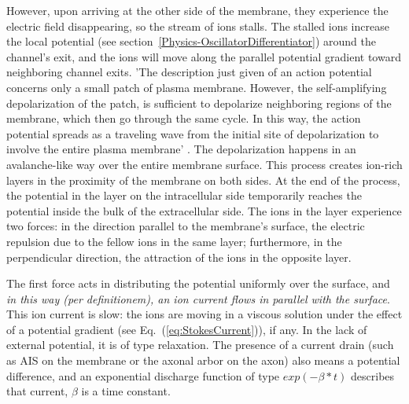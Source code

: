 However, upon arriving at the other side of the  membrane, they experience the
electric field disappearing, so the stream of ions stalls. The stalled ions 
increase the local potential (see section~\ref{Physics-OscillatorDifferentiator}) around the  channel's exit,
and the ions will move along the parallel potential gradient toward neighboring 
channel exits. 
'The description just given of an action potential concerns only a small patch of plasma membrane.
However, the self-amplifying depolarization of the patch, 
is sufficient to depolarize neighboring regions of the membrane,
which then go through the same cycle. In this way,
the action potential spreads as a traveling wave from the initial site of depolarization
to involve the entire plasma membrane' \cite{MolecularBiology:2002}.
The depolarization happens in an avalanche-like way \cite{NeuronalAvalanches:2003} over the entire membrane surface.  
This process creates ion-rich layers in the proximity of the membrane
on both sides. At the end of the process, the potential in the layer on the intracellular side temporarily reaches
the  potential inside the bulk of the extracellular side.
The ions in the layer experience two forces: in the direction 
parallel to the membrane's surface, the electric repulsion due to the fellow ions in the same layer; furthermore, in the perpendicular direction, the attraction of the ions
in the opposite layer.

The first force acts in distributing the potential uniformly  over the surface, and \textit{in this way (per definitionem), an ion 
current flows in parallel with the surface}. This ion current is slow: the ions are moving 
in a viscous solution under the effect of a potential gradient (see Eq.~(\ref{eq:StokesCurrent})), if any. In the lack of external potential, it is of type relaxation. The presence of a current drain (such as \gls{AIS}
on the membrane or the axonal arbor on the axon) also means a potential difference,  and an exponential discharge function of type $exp(-\beta *t)$ 
describes that current, $\beta$ is a time constant.

